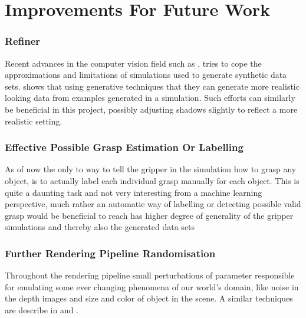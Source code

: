 \section{Improvements For Future Work}

\subsubsection{Refiner}
Recent advances in the computer vision field such as \cite{applerefiner}, tries to cope the approximations and limitations of simulations used to generate synthetic data sets. \cite{applerefiner} shows that using generative techniques that they can generate more realistic looking data from examples generated in a simulation. Such efforts can similarly be beneficial in this project, possibly adjusting shadows slightly to reflect a more realistic setting. 

\subsubsection{Effective Possible Grasp Estimation Or Labelling}
As of now the only to way to tell the gripper in the simulation how to grasp any object, is to actually label each individual grasp manually for each object. This is quite a daunting task and not very interesting from a machine learning perspective, much rather an automatic way of labelling or detecting possible valid grasp would be beneficial to reach has higher degree of generality of the gripper simulations and thereby also the generated data sets

\subsubsection{Further Rendering Pipeline Randomisation}
Throughout the rendering pipeline small perturbations of parameter responsible for emulating some ever changing phenomena of our world's domain, like noise in the depth images and size and color of object in the scene. A similar techniques are describe in \cite{Shotton2013} and \cite{Tobin2017}.